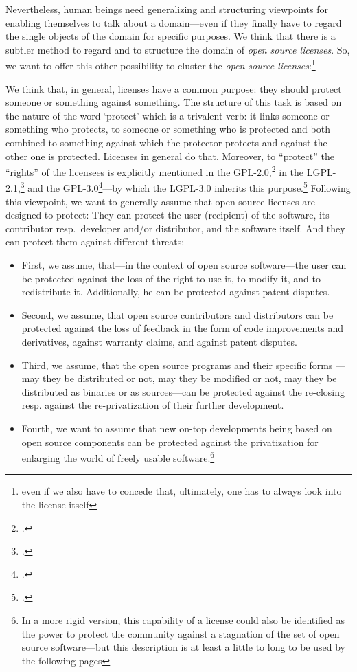 Nevertheless, human beings need generalizing and structuring viewpoints for
enabling themselves to talk about a domain---even if they finally have to
regard the single objects of the domain for specific purposes. We think that
there is a subtler method to regard and to structure the domain of \emph{open
source licenses}. So, we want to offer this other possibility to cluster the
\emph{open source licenses}:\footnote{even if we also have to concede that,
ultimately, one has to always look into the license itself}

We think that, in general, licenses have a common purpose: they should protect
someone or something against something. The structure of this task is based on
the nature of the word `protect' which is a trivalent verb: it links someone or
something who protects, to someone or something who is protected and both
combined to something against which the protector protects and against the other
one is protected. Licenses in general do that. Moreover, to \enquote{protect}
the \enquote{rights} of the licensees is explicitly mentioned in the
GPL-2.0,\footcite[cf.][\nopage wp. Preamble]{Gpl20OsiLicense1991a} in the
LGPL-2.1,\footcite[cf.][\nopage wp. Preamble]{Lgpl21OsiLicense1999a} and the
GPL-3.0\footcite[cf.][\nopage wp. Preamble]{Gpl30OsiLicense2007a}---by which the
LGPL-3.0 inherits this purpose.\footcite[cf.][\nopage wp.
prefix]{Lgpl30OsiLicense2007a} Following this viewpoint, we want to generally
assume that open source licenses are designed to protect: They can protect
the user (recipient) of the software, its contributor resp.\ developer and/or
distributor, and the software itself. And they can protect them against
different threats:

\begin{itemize}
  \item First, we assume, that---in the context of open source software---the
  user can be protected against the loss of the right to use it, to modify it,
  and to redistribute it. Additionally, he can be protected against patent
  disputes.
  \item Second, we assume, that open source contributors and distributors can be
  protected against the loss of feedback in the form of code improvements and
  derivatives, against warranty claims, and against patent disputes.
  \item Third, we assume, that the open source programs and their specific forms%
  ---may they be distributed or not, may they be modified or not, may they be
  distributed as binaries or as sources---can be protected against the
  re-closing resp. against the re-privatization of their further development.
  \item Fourth, we want to assume that new on-top developments being based on
  open source components can be protected against the privatization for enlarging
  the world of freely usable software.\footnote{In a more rigid version, this
  capability of a license could also be identified as the power to protect the
  community against a stagnation of the set of open source software---but this
  description is at least a little to long to be used by the following pages}
\end{itemize}

